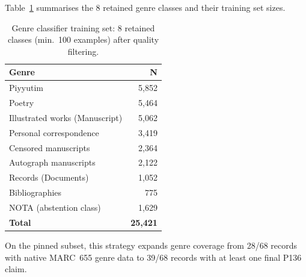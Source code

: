\documentclass[Afour,sageh,times]{sagej}
\begin{document}
Table~\ref{tab:genre-classifier} summarises the 8 retained genre classes and their training set sizes.

\begin{table}[t]
\caption{Genre classifier training set: 8 retained classes (min.\ 100 examples) after quality filtering.}
\label{tab:genre-classifier}
\centering
\small
\begin{tabular}{lr}
\toprule
\textbf{Genre} & \textbf{N} \\
\midrule
Piyyutim & 5,852 \\
Poetry & 5,464 \\
Illustrated works (Manuscript) & 5,062 \\
Personal correspondence & 3,419 \\
Censored manuscripts & 2,364 \\
Autograph manuscripts & 2,122 \\
Records (Documents) & 1,052 \\
Bibliographies & 775 \\
\midrule
NOTA (abstention class) & 1,629 \\
\midrule
\textbf{Total} & \textbf{25,421} \\
\bottomrule
\end{tabular}
\end{table}

On the pinned subset, this strategy expands genre coverage from 28/68 records with native MARC~655 genre data to 39/68 records with at least one final P136 claim.

\end{document}
